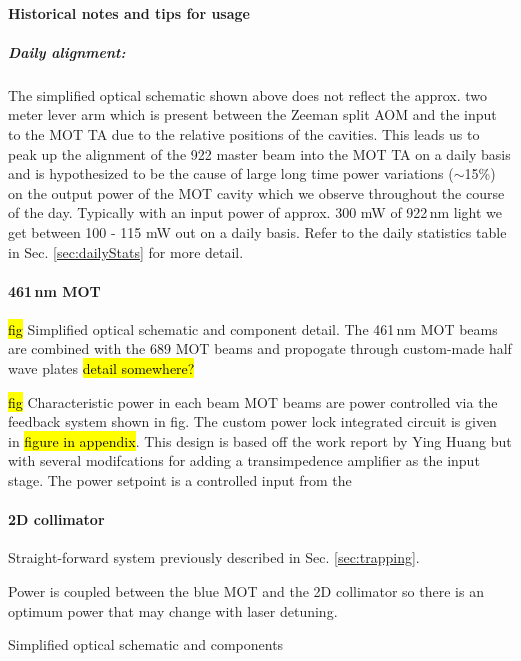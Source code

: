 \paragraph{Historical notes and tips for usage}
\subparagraph{Daily alignment:}
The simplified optical schematic shown above does not reflect the approx. two meter lever arm which is present between the Zeeman split AOM and the input to the MOT TA due to the relative positions of the cavities.
This leads us to peak up the alignment of the 922 master beam into the MOT TA on a daily basis and is hypothesized to be the cause of large long time power variations ($\sim$15\%) on the output power of the MOT cavity which we observe throughout the course of the day.
Typically with an input power of approx. 300 mW of 922\,nm light we get between 100 - 115 mW out on a daily basis.
Refer to the daily statistics table in Sec. \ref{sec:dailyStats} for more detail.

\paragraph{461\,nm MOT}

\hl{fig} Simplified optical schematic and component detail.
The 461\,nm MOT beams are combined with the 689 MOT beams and propogate through custom-made half wave plates \hl{detail somewhere?}

\hl{fig}
Characteristic power in each beam
MOT beams are power controlled via the feedback system shown in fig.
The custom power lock integrated circuit is given in \hl{figure in appendix}.
This design is based off the work report by Ying Huang but with several modifcations for adding a transimpedence amplifier as the input stage.
The power setpoint is a controlled input from the 

\paragraph{2D collimator}
Straight-forward system previously described in Sec. \ref{sec:trapping}.

Power is coupled between the blue MOT and the 2D collimator so there is an optimum power that may change with laser detuning. 

Simplified optical schematic and components
	

